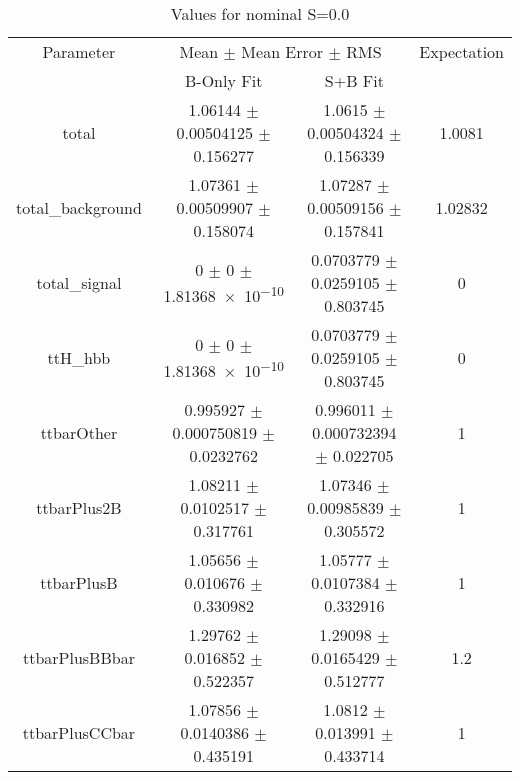\begin{table}
\centering
\caption{Values for nominal S=0.0}
\begin{tabular}{cccc}
\toprule
Parameter & \multicolumn{2}{c}{Mean $\pm$ Mean Error $\pm$ RMS} & Expectation\\
 & B-Only Fit & S+B Fit & \\
\midrule
total & \num{1.06144} $\pm$ \num{0.00504125} $\pm$ \num{0.156277} & \num{1.0615} $\pm$ \num{0.00504324} $\pm$ \num{0.156339} & \num{1.0081}\\
total\_background & \num{1.07361} $\pm$ \num{0.00509907} $\pm$ \num{0.158074} & \num{1.07287} $\pm$ \num{0.00509156} $\pm$ \num{0.157841} & \num{1.02832}\\
total\_signal & \num{0} $\pm$ \num{0} $\pm$ \num{1.81368e-10} & \num{0.0703779} $\pm$ \num{0.0259105} $\pm$ \num{0.803745} & \num{0}\\
ttH\_hbb & \num{0} $\pm$ \num{0} $\pm$ \num{1.81368e-10} & \num{0.0703779} $\pm$ \num{0.0259105} $\pm$ \num{0.803745} & \num{0}\\
ttbarOther & \num{0.995927} $\pm$ \num{0.000750819} $\pm$ \num{0.0232762} & \num{0.996011} $\pm$ \num{0.000732394} $\pm$ \num{0.022705} & \num{1}\\
ttbarPlus2B & \num{1.08211} $\pm$ \num{0.0102517} $\pm$ \num{0.317761} & \num{1.07346} $\pm$ \num{0.00985839} $\pm$ \num{0.305572} & \num{1}\\
ttbarPlusB & \num{1.05656} $\pm$ \num{0.010676} $\pm$ \num{0.330982} & \num{1.05777} $\pm$ \num{0.0107384} $\pm$ \num{0.332916} & \num{1}\\
ttbarPlusBBbar & \num{1.29762} $\pm$ \num{0.016852} $\pm$ \num{0.522357} & \num{1.29098} $\pm$ \num{0.0165429} $\pm$ \num{0.512777} & \num{1.2}\\
ttbarPlusCCbar & \num{1.07856} $\pm$ \num{0.0140386} $\pm$ \num{0.435191} & \num{1.0812} $\pm$ \num{0.013991} $\pm$ \num{0.433714} & \num{1}\\
\bottomrule
\end{tabular}
\end{table}